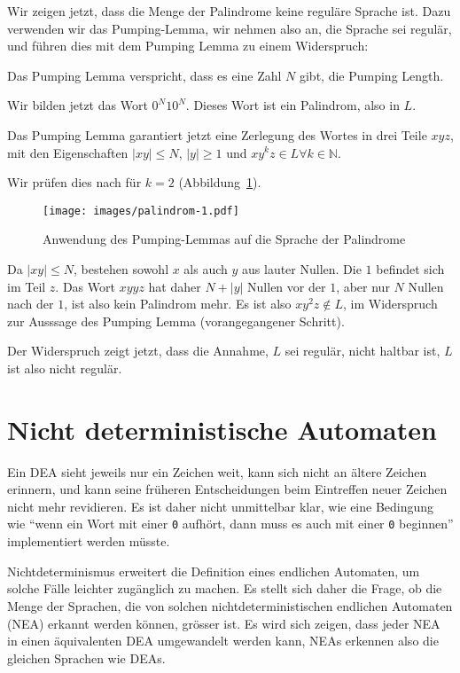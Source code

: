 Wir zeigen jetzt, dass die Menge der Palindrome keine reguläre Sprache ist.
Dazu verwenden wir das Pumping-Lemma, wir nehmen also an, die Sprache
sei regulär, und führen dies mit dem Pumping Lemma zu einem
Widerspruch:
\begin{compactenum}
\item Das Pumping Lemma verspricht, dass es eine Zahl $N$ gibt, die
Pumping Length.
\item Wir bilden jetzt das Wort $0^N10^N$.
Dieses Wort ist ein Palindrom,
also in $L$.
\item Das Pumping Lemma garantiert jetzt eine Zerlegung des Wortes
in drei Teile $xyz$, mit den Eigenschaften $|xy|\le N$, $|y|\ge 1$ und
$xy^kz\in L\forall k\in\mathbb N$.
\item Wir prüfen dies nach für $k=2$ (Abbildung~\ref{regular:pl-palindrome}).
\begin{figure}
\centering
\texttt{[image: images/palindrom-1.pdf]}
\caption{Anwendung des Pumping-Lemmas auf die Sprache der Palindrome
\label{regular:pl-palindrome}}
\end{figure}
Da $|xy|\le N$, bestehen sowohl $x$ als auch $y$ aus lauter Nullen.
Die $1$ befindet sich im Teil $z$.
Das Wort $xyyz$ hat daher $N+|y|$ Nullen vor der $1$, aber nur $N$ Nullen
nach der $1$, ist also kein Palindrom mehr.
Es ist also $xy^2z\not\in L$,
im Widerspruch zur Ausssage des Pumping Lemma (vorangegangener Schritt).
\end{compactenum}
Der Widerspruch zeigt jetzt, dass die Annahme, $L$ sei regulär, nicht
haltbar ist, $L$ ist also nicht regulär.

\section{Nicht deterministische Automaten\label{regulaer:nea}}
Ein DEA sieht jeweils nur ein Zeichen weit, kann sich nicht an ältere
Zeichen erinnern, und kann seine früheren Entscheidungen beim Eintreffen
neuer Zeichen nicht mehr revidieren.
Es ist daher nicht unmittelbar klar,
wie eine Bedingung wie ``wenn ein
Wort mit einer {\tt 0} aufhört, dann muss es auch mit einer {\tt 0}
beginnen'' implementiert werden müsste.

%
%
Nichtdeterminismus erweitert 
die Definition eines endlichen Automaten, um solche Fälle leichter 
zugänglich zu machen.
Es stellt sich daher die Frage, ob die Menge 
der Sprachen, die von solchen nichtdeterministischen endlichen Automaten (NEA)
erkannt werden können,
grösser ist.
Es wird sich zeigen, dass jeder NEA
in einen äquivalenten DEA umgewandelt werden kann, NEAs erkennen also
die gleichen Sprachen wie DEAs.

